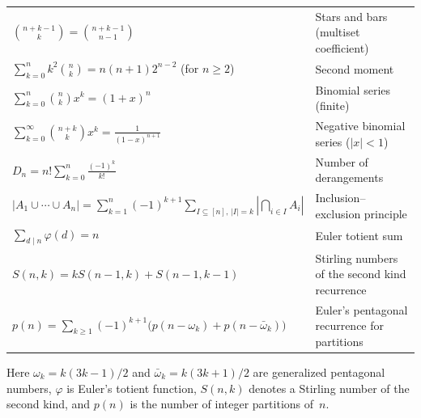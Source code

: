 \documentclass[12pt,a4paper,openany]{book}
\theoremstyle{definition}
\theoremstyle{plain}
\theoremstyle{remark}
\newcommand{\abs}[1]{\left|#1\right|}
\begin{document}
\begin{longtable}{p{5cm}p{8cm}}
$\displaystyle\binom{n+k-1}{k}=\binom{n+k-1}{n-1}$
  & Stars and bars (multiset coefficient)
  \index{stars and bars}\\

$\displaystyle\sum_{k=0}^{n}k^2\binom{n}{k}
  =n(n+1)2^{n-2}$  \newline (for $n\ge 2$)
  & Second moment\\

$\displaystyle\sum_{k=0}^{n}\binom{n}{k}x^k=(1+x)^n$
  & Binomial series (finite)\\

$\displaystyle\sum_{k=0}^{\infty}\binom{n+k}{k}x^k
  =\frac{1}{(1-x)^{n+1}}$
  & Negative binomial series ($\abs{x}<1$)
  \index{negative binomial series}\\

$\displaystyle D_n=n!\sum_{k=0}^{n}\frac{(-1)^k}{k!}$
  & Number of derangements
  \index{derangement}\\

$\displaystyle\abs{A_1\cup\cdots\cup A_n}
  =\sum_{k=1}^{n}(-1)^{k+1}
  \!\!\sum_{I\subseteq[n],\,\abs{I}=k}\!\!\abs{\bigcap_{i\in I}A_i}$
  & Inclusion--exclusion principle
  \index{inclusion-exclusion}\\

$\displaystyle\sum_{d\mid n}\varphi(d)=n$
  & Euler totient sum
  \index{Euler totient function}\\

$\displaystyle S(n,k)=kS(n-1,k)+S(n-1,k-1)$
  & Stirling numbers of the second kind recurrence
  \index{Stirling number!second kind}\\

$\displaystyle p(n)=\sum_{k\ge 1}(-1)^{k+1}
  \bigl(p(n-\omega_k)+p(n-\bar\omega_k)\bigr)$
  & Euler's pentagonal recurrence for partitions
  \index{partition!pentagonal recurrence}\\

\end{longtable}

\noindent
Here $\omega_k=k(3k-1)/2$ and $\bar\omega_k=k(3k+1)/2$ are
generalized pentagonal numbers, $\varphi$ is Euler's totient function,
$S(n,k)$ denotes a Stirling number of the second kind, and $p(n)$ is
the number of integer partitions of~$n$.
\end{document}
